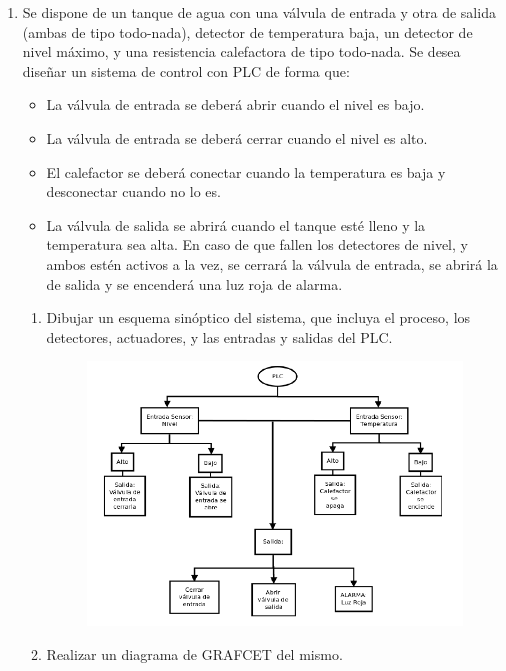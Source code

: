 \documentclass[10pt,a4paper,spanish]{article}
\begin{document}
\begin{enumerate}
    \newpage
    \item Se dispone de un tanque de agua con una válvula de entrada y otra de salida (ambas de tipo todo-nada), detector de temperatura baja, un detector de nivel máximo, y una resistencia calefactora de tipo todo-nada. Se desea diseñar un sistema de control con PLC de forma que:
    \begin{itemize}
      \item La válvula de entrada se deberá abrir cuando el nivel es bajo.
      \item La válvula de entrada se deberá cerrar cuando el nivel es alto.
      \item El calefactor se deberá conectar cuando la temperatura es baja y desconectar cuando no lo es.
      \item La válvula de salida se abrirá cuando el tanque esté lleno y la temperatura sea alta. En caso de que fallen los detectores de nivel, y ambos estén activos a la vez, se cerrará la válvula de entrada, se abrirá la de salida y se encenderá una luz roja de alarma.
    \end{itemize}

    \begin{enumerate}
      \item Dibujar un esquema sinóptico del sistema, que incluya el proceso, los detectores, actuadores, y las entradas y salidas del PLC.

      \begin{figure}[!hbp]
        \centering  \includegraphics[width=1\textwidth]{./Imagenes/2.png}
      \end{figure}

      \newpage
      \item Realizar un diagrama de GRAFCET del mismo.


\end{enumerate}
\end{enumerate}
\end{document}
